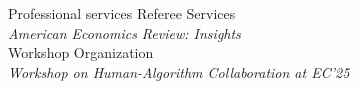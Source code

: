 \documentclass{resume} %
\newcommand{\itab}[1]{\hspace{0em}\rlap{#1}}
\begin{document}










\begin{rSection}{Professional services}
Referee Services\\
\-\hspace{1em}\emph{American Economics Review: Insights} \\
Workshop Organization \\
\-\hspace{1em}\emph{Workshop on Human-Algorithm Collaboration at EC'25}
\end{rSection}
\end{document}
